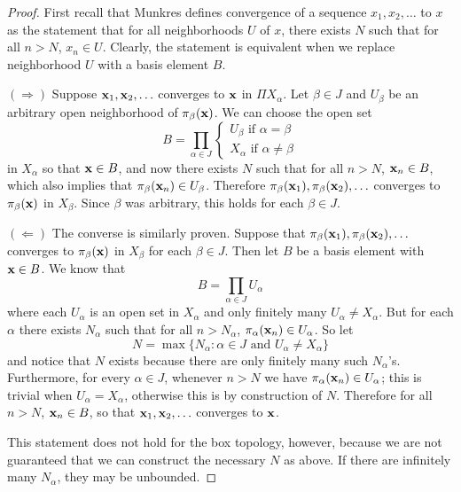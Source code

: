 \documentclass[11pt]{article}
\begin{document}
\begin{proof}
  First recall that Munkres defines convergence of a sequence $x_1,x_2,\ldots$ to $x$ as
  the statement that for all neighborhoods $U$ of $x$, there exists $N$ such
  that for all $n > N$, $x_n \in U$. Clearly, the statement is equivalent when
  we replace neighborhood $U$ with a basis element $B$.

  $(\Longrightarrow)$ Suppose $\vb x_1, \vb x_2, \ldots$ converges to $\vb x$ in
  $\Pi X_\alpha$. Let $\beta \in J$ and $U_\beta$ be an arbitrary open
  neighborhood of $\pi_\beta(\vb x)$. We can choose the open set
  \[ B = \prod_{\alpha \in J} \begin{cases}
      U_\beta \text{ if } \alpha = \beta \\
      X_\alpha \text{ if } \alpha \neq \beta
  \end{cases}\]
  in $X_\alpha$ so that $\vb x \in B$, and now there exists $N$ such that for
  all $n > N$, $\vb x_n \in
  B$, which also implies that $\pi_\beta(\vb x_n) \in U_\beta$. Therefore
  $\pi_\beta(\vb x_1), \pi_\beta(\vb x_2), \ldots$ converges to $\pi_\beta(\vb
  x)$ in $X_\beta$. Since $\beta$ was arbitrary, this holds for each
  $\beta \in J$.

  $(\Longleftarrow)$ The converse is similarly proven. Suppose that
  $\pi_\beta(\vb x_1), \pi_\beta(\vb x_2), \ldots$ converges to $\pi_\beta(\vb
  x)$ in $X_\beta$ for each $\beta \in J$. Then let $B$ be a basis element with
  $\vb x \in B$. We know that
  \[ B = \prod_{\alpha \in J} U_\alpha \]
  where each $U_\alpha$ is an open set in $X_\alpha$ and only finitely many $U_\alpha \neq
  X_\alpha.$ But for each $\alpha$
  there exists $N_\alpha$ such that for all $n > N_\alpha$, $\pi_\alpha(\vb x_n)
  \in U_\alpha$. So let
  \[ N = \max\{N_\alpha : \alpha \in J \text{ and } U_\alpha \neq X_\alpha\} \]
  and notice that $N$ exists because there are only finitely many
  such $N_\alpha$'s. Furthermore, for every $\alpha \in J$, whenever $n > N$ we
  have $\pi_\alpha(\vb x_n) \in U_\alpha$; this is trivial when $U_\alpha =
  X_\alpha$, otherwise this is by construction of $N$. Therefore for all $n >
  N$, $\vb x_n \in B$, so that $\vb x_1, \vb x_2, \ldots$ converges to $\vb
  x$.

  This statement does  not hold for the box topology, however, because we are
  not guaranteed that we can construct the necessary $N$ as above. If there are
  infinitely many $N_\alpha$, they may be unbounded.
\end{proof}
\end{document}

